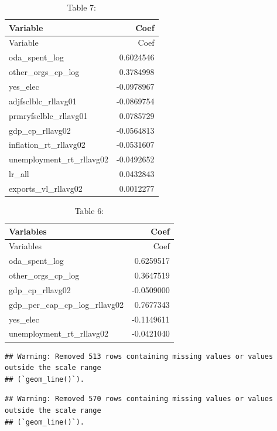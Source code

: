 \documentclass[
]{article}
\begin{document}
\begin{longtable}[]{@{}lr@{}}
\caption{Table 7:}\tabularnewline
\toprule\noalign{}
Variable & Coef \\
\midrule\noalign{}
\endfirsthead
\toprule\noalign{}
Variable & Coef \\
\midrule\noalign{}
\endhead
\bottomrule\noalign{}
\endlastfoot
oda\_spent\_log & 0.6024546 \\
other\_orgs\_cp\_log & 0.3784998 \\
yes\_elec & -0.0978967 \\
adjfsclblc\_rllavg01 & -0.0869754 \\
prmryfsclblc\_rllavg01 & 0.0785729 \\
gdp\_cp\_rllavg02 & -0.0564813 \\
inflation\_rt\_rllavg02 & -0.0531607 \\
unemployment\_rt\_rllavg02 & -0.0492652 \\
lr\_all & 0.0432843 \\
exports\_vl\_rllavg02 & 0.0012277 \\
\end{longtable}

\begin{longtable}[]{@{}lr@{}}
\caption{Table 6:}\tabularnewline
\toprule\noalign{}
Variables & Coef \\
\midrule\noalign{}
\endfirsthead
\toprule\noalign{}
Variables & Coef \\
\midrule\noalign{}
\endhead
\bottomrule\noalign{}
\endlastfoot
oda\_spent\_log & 0.6259517 \\
other\_orgs\_cp\_log & 0.3647519 \\
gdp\_cp\_rllavg02 & -0.0509000 \\
gdp\_per\_cap\_cp\_log\_rllavg02 & 0.7677343 \\
yes\_elec & -0.1149611 \\
unemployment\_rt\_rllavg02 & -0.0421040 \\
\end{longtable}

\begin{verbatim}
## Warning: Removed 513 rows containing missing values or values outside the scale range
## (`geom_line()`).
\end{verbatim}

\begin{verbatim}
## Warning: Removed 570 rows containing missing values or values outside the scale range
## (`geom_line()`).
\end{verbatim}
\end{document}
